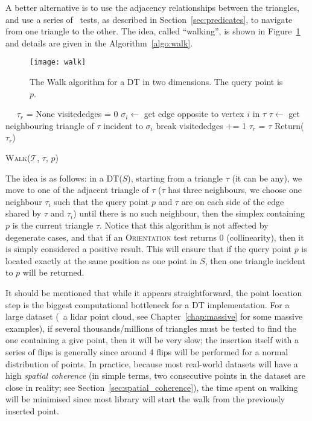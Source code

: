 A better alternative is to use the adjacency relationships between the triangles, and use a series of \Orient\ tests, as described in Section~\ref{sec:predicates}, to navigate from one triangle to the other. 
The idea, called ``walking'', is shown in Figure~\ref{fig:walk} and details are given in the Algorithm~\ref{algo:walk}.
\begin{figure}
  \centering
  \texttt{[image: walk]}
  \caption{The Walk algorithm for a DT in two dimensions. The query point is $p$.}%
\label{fig:walk}
\end{figure}
\begin{algorithm}[t]
  \DontPrintSemicolon\
  \KwOut{$\tau_r$: the triangle in $\mathcal{T}$ containing $p$}
  \BlankLine\ 
  $\tau_r$ = None\;
  {
    visitededges = 0\;
    {
      $\sigma_i \leftarrow$ get edge opposite to vertex $i$ in $\tau$\;
      {
        $\tau \leftarrow$ get neighbouring triangle of $\tau$ incident to $\sigma_i$\;
        break\;
      }
      visitededges += 1\;
    }  
    {
      $\tau_r$ = $\tau$\;
    }
  }
  Return($\tau_r$)
  \caption{W\textsc{alk}($\mathcal{T}$, $\tau$, $p$)}%
\label{algo:walk}
\end{algorithm}
The idea is as follows: in a DT($S$), starting from a triangle $\tau$ (it can be any), we move to one of the adjacent triangle of $\tau$ ($\tau$ has three neighbours, we choose one neighbour $\tau_i$ such that the query point $p$ and $\tau$ are on each side of the edge shared by $\tau$ and $\tau_i$) until there is no such neighbour, then the simplex containing $p$ is the current triangle $\tau$.
Notice that this algorithm is not affected by degenerate cases, and that if an \textrm{O}\textsc{rientation} test returns 0 (collinearity), then it is simply considered a positive result. 
This will ensure that if the query point $p$ is located exactly at the same position as one point in $S$, then one triangle incident to $p$ will be returned.

It should be mentioned that while it appears straightforward, the point location step is the biggest computational bottleneck for a DT implementation.
For a large dataset (\eg\ a lidar point cloud, see Chapter~\ref{chap:massive} for some massive examples), if several thousands/millions of triangles must be tested to find the one containing a give point, then it will be very slow; the insertion itself with a series of flips is generally since around 4 flips will be performed for a normal distribution of points.
In practice, because most real-world datasets will have a high \emph{spatial coherence} (in simple terms, two consecutive points in the dataset are close in reality; see Section~\ref{sec:spatial_coherence}), the time spent on walking will be minimised since most library will start the walk from the previously inserted point.


